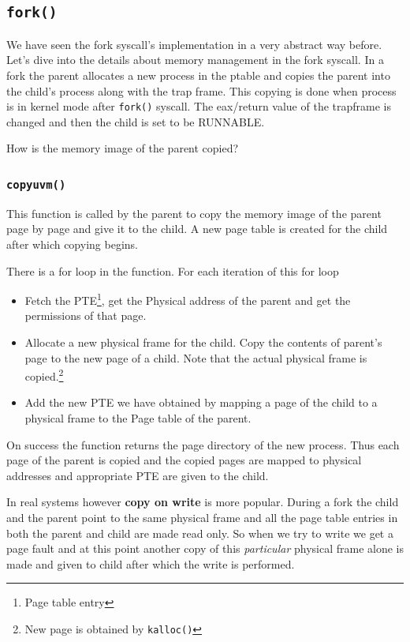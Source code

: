 \documentclass[12pt]{article}
\newcommand{\tbox}[1]{\noindent\fbox{\parbox{\textwidth}{#1}}}
\begin{document}
\newpage
\noindent\tbox{
    \begin{center}
    \textbf{\Huge Lecture 21}
    \end{center}
}
\subsection{\texttt{fork()}}
We have seen the fork syscall's implementation in a very abstract way before. Let's dive into the details about memory management in the fork syscall.
In a fork the parent allocates a new process in the ptable and copies the parent into the child's process along with the trap frame. This copying is done when process is in kernel mode after \texttt{fork()} syscall.
The eax/return value of the trapframe is changed and then the child is set to be RUNNABLE.

How is the memory image of the parent copied?
\subsubsection{\texttt{copyuvm()}}
This function is called by the parent to copy the memory image of the parent page by page and give it to the child.
A new page table is created for the child after which copying begins. 

There is a for loop in the function. For each iteration of this for loop
\begin{itemize}[topsep=0pt, partopsep=0pt, itemsep=0pt, parsep=0pt]
    \item Fetch the PTE\footnote{Page table entry}, get the Physical address of the parent and get the permissions of that page.
    \item Allocate a new physical frame for the child. Copy the contents of parent's page to the new page of a child. Note that the actual physical frame is copied.\footnote{New page is obtained by \texttt{kalloc()}}
    \item Add the new PTE we have obtained by mapping a page of the child to a physical frame to the Page table of the parent. 
\end{itemize}

On success the function returns the page directory of the new process. Thus each page of the parent is copied and the copied pages are mapped to physical addresses and appropriate PTE are given to the child.

In real systems however \textbf{copy on write} is more popular. During a fork the child and the parent point to the same physical frame and all the page table entries
in both the parent and child are made read only. So when we try to write we get a page fault and at this point another copy of this \textit{particular} physical frame alone is made and given to child after which the write is performed. 
\end{document}
